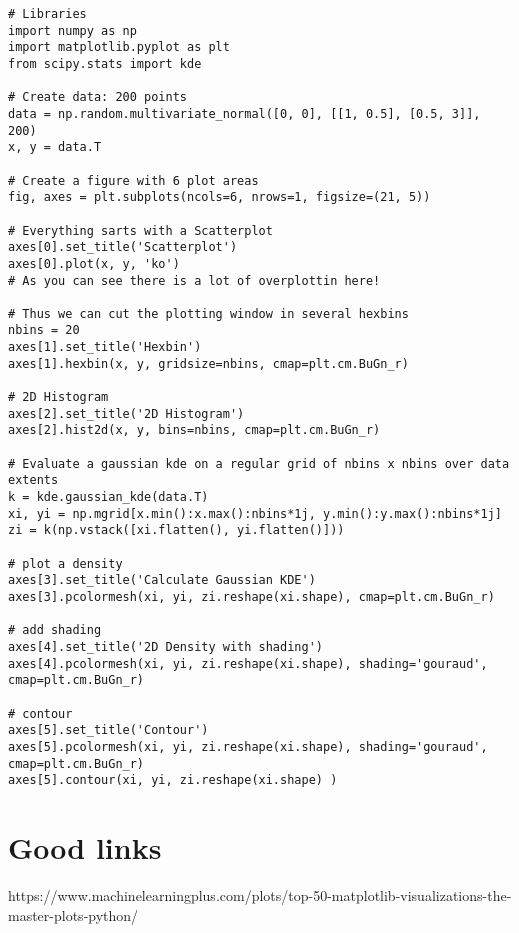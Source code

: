 \documentclass[11pt,a4paper]{article}
\begin{document}
\begin{lstlisting}
# Libraries
import numpy as np
import matplotlib.pyplot as plt
from scipy.stats import kde
 
# Create data: 200 points
data = np.random.multivariate_normal([0, 0], [[1, 0.5], [0.5, 3]], 200)
x, y = data.T
 
# Create a figure with 6 plot areas
fig, axes = plt.subplots(ncols=6, nrows=1, figsize=(21, 5))
 
# Everything sarts with a Scatterplot
axes[0].set_title('Scatterplot')
axes[0].plot(x, y, 'ko')
# As you can see there is a lot of overplottin here!
 
# Thus we can cut the plotting window in several hexbins
nbins = 20
axes[1].set_title('Hexbin')
axes[1].hexbin(x, y, gridsize=nbins, cmap=plt.cm.BuGn_r)
 
# 2D Histogram
axes[2].set_title('2D Histogram')
axes[2].hist2d(x, y, bins=nbins, cmap=plt.cm.BuGn_r)
 
# Evaluate a gaussian kde on a regular grid of nbins x nbins over data extents
k = kde.gaussian_kde(data.T)
xi, yi = np.mgrid[x.min():x.max():nbins*1j, y.min():y.max():nbins*1j]
zi = k(np.vstack([xi.flatten(), yi.flatten()]))
 
# plot a density
axes[3].set_title('Calculate Gaussian KDE')
axes[3].pcolormesh(xi, yi, zi.reshape(xi.shape), cmap=plt.cm.BuGn_r)
 
# add shading
axes[4].set_title('2D Density with shading')
axes[4].pcolormesh(xi, yi, zi.reshape(xi.shape), shading='gouraud', cmap=plt.cm.BuGn_r)
 
# contour
axes[5].set_title('Contour')
axes[5].pcolormesh(xi, yi, zi.reshape(xi.shape), shading='gouraud', cmap=plt.cm.BuGn_r)
axes[5].contour(xi, yi, zi.reshape(xi.shape) )

\end{lstlisting}



\newpage
\section{Good links}
https://www.machinelearningplus.com/plots/top-50-matplotlib-visualizations-the-master-plots-python/
\end{document}
